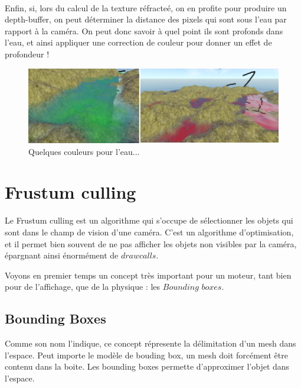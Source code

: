 \documentclass{EPUProjetDi}
\begin{document}
\paragraph{}
Enfin, si, lors du calcul de la texture réfracteé, on en profite pour produire un depth-buffer, on peut déterminer la distance des pixels qui sont sous l'eau par rapport à la caméra. On peut donc savoir à quel point ils sont profonds dans l'eau, et ainsi appliquer
une correction de couleur pour donner un effet de profondeur !


\begin{figure}[h]
	\centering
	\includegraphics[scale=.5]{water_colors}
	\caption{Quelques couleurs pour l'eau...}
	\label{fig:water_colors}
\end{figure}

\section{Frustum culling}

Le Frustum culling est un algorithme qui s'occupe de sélectionner les objets qui sont dans le champ de vision d'une caméra.
C'est un algorithme d'optimisation, et il permet bien souvent de ne pas afficher les objets non visibles par la caméra, épargnant ainsi énormément de $drawcalls$.

Voyons en premier temps un concept très important pour un moteur, tant bien pour de l'affichage, que de la physique : les $Bounding$ $boxes$.

\subsection{Bounding Boxes}

Comme son nom l'indique, ce concept répresente la délimitation d'un mesh dans l'espace. Peut importe le modèle de bouding box, un mesh doit forcément être contenu dans la boite.
Les bounding boxes permette d'approximer l'objet dans l'espace. 
\end{document}
